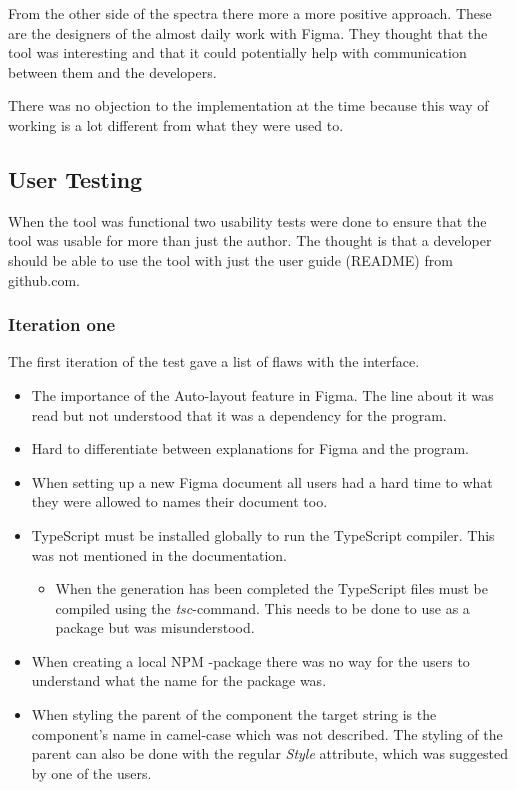 From the other side of the  spectra there more a more positive approach. These are the designers of the almost daily work with Figma. They thought that the tool was interesting and that it could potentially help with communication between them and the developers.

There was no objection to the implementation at the time because this way of working is a lot different from what they were used to.  


\subsection{User Testing}%
\label{sub:User Testing}
When the tool was functional two usability tests were done to ensure that the tool was usable for more than just the author. The thought is that a developer should be able to use the tool with just the user guide (README) from github.com.

\subsubsection{Iteration one}%
\label{ssub:Iteration one}
The first iteration of the test gave a list of flaws with the interface.
\begin{itemize}
   \item The importance of the Auto-layout feature in Figma. The line about it was read but not understood that it was a dependency for the program. 
   \item Hard to differentiate between explanations for Figma and the program.
   \item When setting up a new Figma document all users had a hard time to what they were allowed to names their document too.
   \item TypeScript must be installed globally to run the TypeScript compiler. This was not mentioned in the documentation. 
      \begin{itemize}
         \item When the generation has been completed the TypeScript files must be compiled using the \textit{tsc}-command. This needs to be done to use as a package but was misunderstood.
      \end{itemize}
   \item When creating a local NPM -package there was no way for the users to understand what the name for the package was. 
   \item When styling the parent of the component the target string is the component's name in camel-case which was not described. The styling of the parent can also be done with the regular \textit{Style} attribute, which was suggested by one of the users.
\end{itemize}

